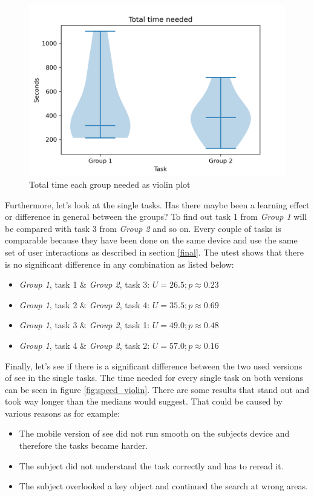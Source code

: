 \begin{figure}[htb]
  \centering
  \includegraphics*[width=1\textwidth]{Evaluation/img/group_time_violin.png}
  \caption{Total time each group needed as violin plot}
  \label{fig:group_time_violin}
\end{figure}

Furthermore, let's look at the single tasks. 
Has there maybe been a learning effect or difference in general between the groups? 
To find out task 1 from \textit{Group 1} will be compared with task 3 from \textit{Group 2} and so on.
Every couple of tasks is comparable because they have been done on the same device and use the same set of user interactions as described in section \ref{final}.
The \gls{utest} shows that there is no significant difference in any combination as listed below:
\begin{itemize}
  \item \textit{Group 1}, task 1 \& \textit{Group 2}, task 3: $U = 26.5; p \approx 0.23$
  \item \textit{Group 1}, task 2 \& \textit{Group 2}, task 4: $U = 35.5; p \approx 0.69$
  \item \textit{Group 1}, task 3 \& \textit{Group 2}, task 1: $U = 49.0; p \approx 0.48$
  \item \textit{Group 1}, task 4 \& \textit{Group 2}, task 2: $U = 57.0; p \approx 0.16$
\end{itemize}

Finally, let's see if there is a significant difference between the two used versions of \gls{see} in the single tasks.
The time needed for every single task on both versions can be seen in figure \ref{fig:speed_violin}.
There are some results that stand out and took way longer than the medians would suggest.
That could be caused by various reasons as for example:
\begin{itemize}
  \item The mobile version of \gls{see} did not run smooth on the subjects device and therefore the tasks became harder.
  \item The subject did not understand the task correctly and has to reread it.
  \item The subject overlooked a key object and continued the search at wrong areas.
\end{itemize}

